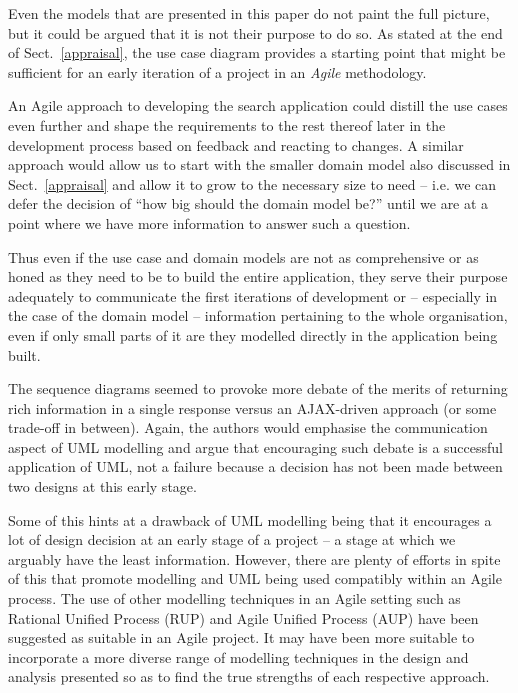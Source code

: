 \documentclass{llncs}
\begin{document}
Even the models that are presented in this paper do not paint the full
picture, but it could be argued that it is not their purpose to do so.
As stated at the end of Sect.~\ref{appraisal}, the use case diagram
provides a starting point that might be sufficient for an early
iteration of a project in an \emph{Agile} methodology\cite{beck2001agile}.

An Agile approach to developing the search application could distill
the use cases even further and shape the requirements to the rest
thereof later in the development process based on feedback and reacting
to changes. A similar approach would allow us to start with the smaller
domain model also discussed in Sect.~\ref{appraisal} and allow it to grow
to the necessary size to need -- i.e. we can defer the decision of ``how big
should the domain model be?'' until we are at a point where we have more
information to answer such a question.

Thus even if the use case and domain models are not as comprehensive or
as honed as they need to be to build the entire application, they serve
their purpose adequately to communicate the first iterations of
development or -- especially in the case of the domain model -- information
pertaining to the whole organisation, even if only small parts of it are
they modelled directly in the application being built.

The sequence diagrams seemed to provoke more debate of the merits of
returning rich information in a single response versus an AJAX-driven
approach (or some trade-off in between). Again, the authors would emphasise the
communication aspect of UML modelling and argue that encouraging such debate
is a successful application of UML, not a failure because a decision
has not been made between two designs at this early stage.

Some of this hints at a drawback of UML modelling being that it encourages
a lot of design decision at an early stage of a project -- a stage at which we arguably
have the least information\cite{kelly2013conway}. However, there are plenty of
efforts in spite of this that promote modelling and UML being used
compatibly within an Agile process. The use of other modelling techniques
in an Agile setting such as
Rational Unified Process (RUP) and Agile Unified Process (AUP) have been
suggested as suitable in an Agile project\cite{ambler2002agile}.
 It may have been more suitable to incorporate
a more diverse range of modelling techniques in the design and analysis
presented so as to find the true strengths of each respective approach.
\end{document}
